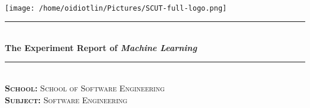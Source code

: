 \documentclass[journal, a4paper]{IEEEtran}
\begin{document}
\begin{titlepage}

\newcommand{\HRule}{\rule{\linewidth}{0.5mm}} %

\center %

~\\[1cm]
\texttt{[image: /home/oidiotlin/Pictures/SCUT-full-logo.png]}\\[2cm] %


\HRule \\[1cm]
{ \huge \bfseries The Experiment Report of \textit{Machine Learning} }\\[0.6cm] %
\HRule \\[2cm]


\textsc{\LARGE \textbf{School:} School of Software Engineering}\\[1cm]
\textsc{\LARGE \textbf{Subject:} Software Engineering}\\[2cm] 

 


\end{titlepage}
\end{document}
